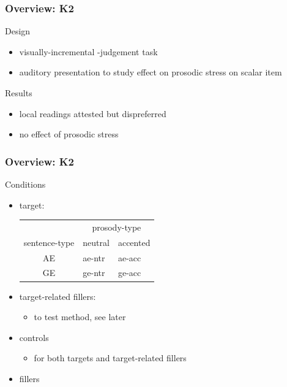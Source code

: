 \documentclass[fleqn,10pt,serif,xcolor=dvipsnames]{beamer}
\renewcommand{\AE}{AE}
\newcommand{\GE}{GE}
\begin{document}
\begin{frame}
  \frametitle{Overview: K2}
  \begin{block}{Design}
    \begin{itemize}
    \item visually-incremental -judgement task
    \item auditory presentation to study effect on prosodic stress on
      scalar item
    \end{itemize}
  \end{block}
  \begin{block}{Results}
    \begin{itemize}
    \item local readings attested but dispreferred
    \item no effect of prosodic stress
    \end{itemize}
  \end{block}
\end{frame}

\begin{frame}
  \frametitle{Overview: K2}
  \begin{block}{Conditions}
    \begin{itemize}
    \item target:
      \begin{center}
        \begin{tabular}{cll}
          & \multicolumn{2}{c}{prosody-type} \\ \cmidrule(r){2-3}
          sentence-type & neutral & accented \\ \midrule
          \AE & ae-ntr & ae-acc \\
          \GE & ge-ntr & ge-acc\\
        \end{tabular}
      \end{center}
    \item target-related fillers:
      \begin{itemize}
      \item to test method, see later
      \end{itemize}
    \item controls
      \begin{itemize}
      \item for both targets and target-related fillers
      \end{itemize}
    \item fillers
    \end{itemize}
  \end{block}
\end{frame}
\end{document}
